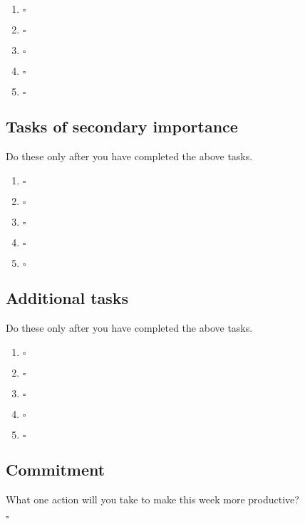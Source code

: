 \documentclass[11pt, oneside, twocolumn]{article}   	%
\begin{document}
\begin{enumerate}[label=\textbf{\arabic*}.]
\item \hrulefill \enspace $\square$
\item \hrulefill \enspace $\square$
\item \hrulefill \enspace $\square$
\item \hrulefill \enspace $\square$
\item \hrulefill \enspace $\square$
\end{enumerate}

\subsection*{Tasks of secondary importance}
\vspace{-0.9em}
{\footnotesize Do these only after you have completed the above tasks.}

\begin{enumerate}[resume, label=\textbf{\arabic*}.]
\item \hrulefill \enspace $\square$
\item \hrulefill \enspace $\square$
\item \hrulefill \enspace $\square$
\item \hrulefill \enspace $\square$
\item \hrulefill \enspace $\square$
\end{enumerate}

\subsection*{Additional tasks}
\vspace{-0.9em}
{\footnotesize Do these only after you have completed the above tasks.}

\begin{enumerate}[resume]
\item \hrulefill \enspace $\square$
\item \hrulefill \enspace $\square$
\item \hrulefill \enspace $\square$
\item \hrulefill \enspace $\square$
\item \hrulefill \enspace $\square$
\end{enumerate}

\subsection*{Commitment}
\vspace{-0.9em}
{\footnotesize What one action will you take to make this week more productive?}

\hrulefill \enspace $\square$
\end{document}
